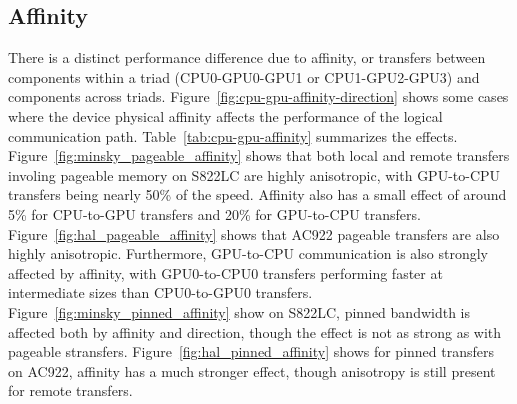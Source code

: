 \subsection{Affinity}
\label{sec:explicit-cpu-gpu-affinity}

There is a distinct performance difference due to affinity, or transfers between components within a triad (CPU0-GPU0-GPU1 or CPU1-GPU2-GPU3) and components across triads.
Figure~\ref{fig:cpu-gpu-affinity-direction} shows some cases where the device physical affinity affects the performance of the logical communication path.
Table~\ref{tab:cpu-gpu-affinity} summarizes the effects.
Figure~\ref{fig:minsky_pageable_affinity} shows that both local and remote transfers involing pageable memory on S822LC are highly anisotropic, with GPU-to-CPU transfers being nearly 50\% of the speed.
Affinity also has a small effect of around 5\% for CPU-to-GPU transfers and 20\% for GPU-to-CPU transfers.
Figure~\ref{fig:hal_pageable_affinity} shows that AC922 pageable transfers are also highly anisotropic. 
Furthermore, GPU-to-CPU communication is also strongly affected by affinity, with GPU0-to-CPU0 transfers performing faster at intermediate sizes than CPU0-to-GPU0 transfers.
Figure~\ref{fig:minsky_pinned_affinity} show on S822LC, pinned bandwidth is affected both by affinity and direction, though the effect is not as strong as with pageable stransfers.
Figure~\ref{fig:hal_pinned_affinity} shows for pinned transfers on AC922, affinity has a much stronger effect, though anisotropy is still present for remote transfers.



